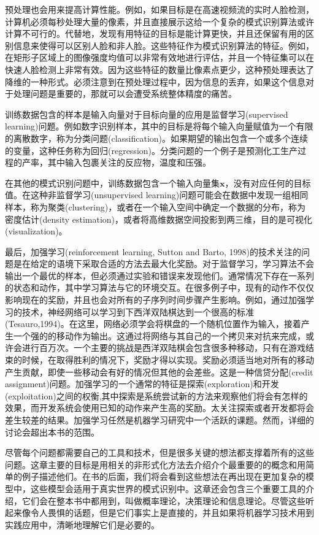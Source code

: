 	预处理也会用来提高计算性能。例如，如果目标是在高速视频流的实时人脸检测，计算机必须每秒处理大量的像素，并且直接展示这给一个复杂的模式识别算法或许计算不可行的。代替地，发现有用特征的目标是能计算更快，并且还保留有用的区别信息来使得可以区别人脸和非人脸。这些特征作为模式识别算法的特征。例如，在矩形子区域上的图像强度均值可以非常有效地进行评估，并且一个特征集可以在快速人脸检测上非常有效。因为这些特征的数量比像素点更少，这种预处理表达了降维的一种形式。必须注意到在预处理过程中，因为信息的丢弃，如果这个信息对于处理问题是重要的，那就可以会遭受系统整体精度的痛苦。
	
	训练数据包含的样本是输入向量对于目标向量的应用是监督学习(supervised learning)问题。例如数字识别样本，其中的目标是将每个输入向量赋值为一个有限的离散数字，称为分类问题(classification)。如果期望的输出包含一个或多个连续的变量，这种任务称为回归(regression)。分类问题的一个例子是预测化工生产过程的产率，其中输入包裹关注的反应物，温度和压强。
	
	在其他的模式识别问题中，训练数据包含一个输入向量集$\mathbf{x}$，没有对应任何的目标值。在这种非监督学习(unsupervised learning)问题可能会在数据中发现一组相同样本，称为聚类(clustering)，或者在一个输入空间中确定一个数据的分布，称为密度估计(density estimation)，或者将高维数据空间投影到两三维，目的是可视化(visualization)。
	
	最后，加强学习(reinforcement learning, Sutton and Barto, 1998)的技术关注的问题是在给定的语境下采取合适的方法去最大化奖励。对于监督学习，学习算法不会输出一个最优的样本，但必须通过实验和错误来发现他们。通常情况下存在一系列的状态和动作，其中学习算法与它的环境交互。在很多例子中，现有的动作不仅仅影响现在的奖励，并且也会对所有的子序列时间步骤产生影响。例如，通过加强学习的技术，神经网络可以学习到下西洋双陆棋达到一个很高的标准(Tesauro,1994)。在这里，网络必须学会将棋盘的一个随机位置作为输入，接着产生一个强的的移动作为输出。这通过将网络与其自己的一个拷贝来对抗来完成，或许会进行百万次。一个主要的挑战是西洋双陆棋会包含很多种移动，只有在游戏结束的时候，在取得胜利的情况下，奖励才得以实现。奖励必须适当地对所有的移动产生贡献，即使一些移动会有好的情况但其他的会差些。这是一种信贷分配(credit assignment)问题。加强学习的一个通常的特征是探索(exploration)和开发(exploitation)之间的权衡,其中探索是系统尝试新的方法来观察他们将会有怎样的效果，而开发系统会使用已知的动作来产生高的奖励。太关注探索或者开发都将会差生较差的结果。加强学习任然是机器学习研究中一个活跃的课题。然而，详细的讨论会超出本书的范围。
	
	尽管每个问题都需要自己的工具和技术，但是很多关键的想法都支撑着所有的这些问题。这章主要的目标是用相关的非形式化方法去介绍介个最重要的的概念和用简单的例子描述他们。在书的后面，我们将会看到这些想法在再出现在更加复杂的模型中，这些模型会适用于真实世界的模式识别中。这章还会包含三个重要工具的介绍，它们会在整本书中都用到，叫做概率理论，决策理论和信息理论。尽管这些听起来像令人畏惧的话题，但是它们事实上是直接的，并且如果将机器学习技术用到实践应用中，清晰地理解它们是必要的。
	
